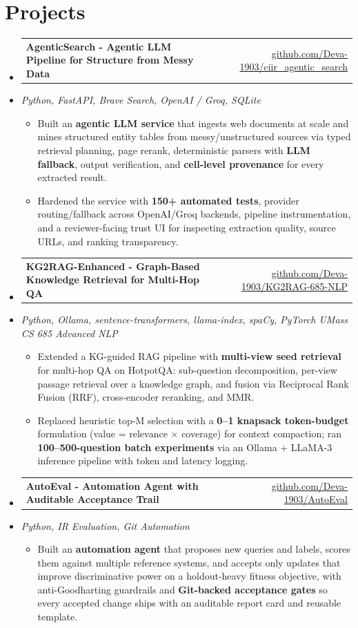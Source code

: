 \documentclass[letterpaper,10pt]{article}
\makeatletter
\newcommand{\resumeItem}[1]{
  \item\small{#1\vspace{-1pt}}
}
\newcommand{\resumeProjectHeading}[2]{
    \item
    \begin{tabular*}{0.985\textwidth}[t]{l@{\extracolsep{\fill}}r}
      \small\textbf{#1} & \small #2 \\
    \end{tabular*}\vspace{-5pt}
}
\newcommand{\resumeProjectSubheading}[1]{
  \vspace{-2pt}\item[] {\small\textcolor{ResumeSlate}{\emph{#1}}}\vspace{-3pt}
}
\newcommand{\resumeSubHeadingListStart}{\begin{itemize}[leftmargin=0.0in, label={}, itemsep=2pt, topsep=2pt]}
\newcommand{\resumeSubHeadingListEnd}{\end{itemize}}
\newcommand{\resumeItemListStart}{\begin{itemize}[leftmargin=0.18in, itemsep=2pt, topsep=1pt]}
\newcommand{\resumeItemListEnd}{\end{itemize}\vspace{-4pt}}
\makeatother
\begin{document}
\section{Projects}
\resumeSubHeadingListStart
  \resumeProjectHeading
    {AgenticSearch - Agentic LLM Pipeline for Structure from Messy Data}
    {\href{https://github.com/Deva-1903/ciir_agentic_search}{github.com/Deva-1903/ciir\_agentic\_search}}
  \resumeProjectSubheading{Python, FastAPI, Brave Search, OpenAI / Groq, SQLite}
    \resumeItemListStart
      \resumeItem{Built an \textbf{agentic LLM service} that ingests web documents at scale and mines structured entity tables from messy/unstructured sources via typed retrieval planning, page rerank, deterministic parsers with \textbf{LLM fallback}, output verification, and \textbf{cell-level provenance} for every extracted result.}
      \resumeItem{Hardened the service with \textbf{150+ automated tests}, provider routing/fallback across OpenAI/Groq backends, pipeline instrumentation, and a reviewer-facing trust UI for inspecting extraction quality, source URLs, and ranking transparency.}
    \resumeItemListEnd
  \resumeProjectHeading
    {KG2RAG-Enhanced - Graph-Based Knowledge Retrieval for Multi-Hop QA}
    {\href{https://github.com/Deva-1903/KG2RAG-685-NLP}{github.com/Deva-1903/KG2RAG-685-NLP}}
  \resumeProjectSubheading{Python, Ollama, sentence-transformers, llama-index, spaCy, PyTorch \enspace\textbar\enspace UMass CS 685 Advanced NLP}
    \resumeItemListStart
      \resumeItem{Extended a KG-guided RAG pipeline with \textbf{multi-view seed retrieval} for multi-hop QA on HotpotQA: sub-question decomposition, per-view passage retrieval over a knowledge graph, and fusion via Reciprocal Rank Fusion (RRF), cross-encoder reranking, and MMR.}
      \resumeItem{Replaced heuristic top-M selection with a \textbf{0--1 knapsack token-budget} formulation (value = relevance \(\times\) coverage) for context compaction; ran \textbf{100--500-question batch experiments} via an Ollama + LLaMA-3 inference pipeline with token and latency logging.}
    \resumeItemListEnd
  \resumeProjectHeading
    {AutoEval - Automation Agent with Auditable Acceptance Trail}
    {\href{https://github.com/Deva-1903/AutoEval}{github.com/Deva-1903/AutoEval}}
  \resumeProjectSubheading{Python, IR Evaluation, Git Automation}
    \resumeItemListStart
      \resumeItem{Built an \textbf{automation agent} that proposes new queries and labels, scores them against multiple reference systems, and accepts only updates that improve discriminative power on a holdout-heavy fitness objective, with anti-Goodharting guardrails and \textbf{Git-backed acceptance gates} so every accepted change ships with an auditable report card and reusable template.}
    \resumeItemListEnd
\resumeSubHeadingListEnd
\vspace{-4pt}
\end{document}
